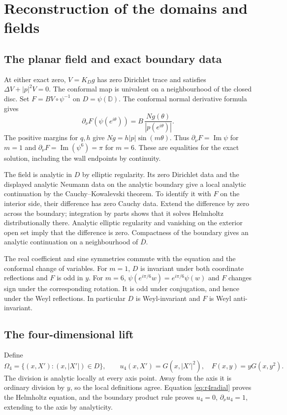 \documentclass[11pt]{amsart}
\theoremstyle{remark}
\numberwithin{equation}{section}
\newcommand{\D}{\mathbb D}
\newcommand{\im}{\operatorname{Im}}
\begin{document}
\section{Reconstruction of the domains and fields}\label{sec:reconstruction}
\subsection{The planar field and exact boundary data}
At either exact zero, $V=K_Dg$ has zero Dirichlet trace and satisfies
$\Delta V+|p|^2V=0$. The conformal map is univalent on a neighbourhood
of the closed disc. Set $F=B V\circ\psi^{-1}$ on $D=\psi(\D)$.
The conformal normal derivative formula gives
\[
 \partial_\nu F(\psi(e^{i\theta}))
       =B\,\frac{Ng(\theta)}{|p(e^{i\theta})|}.
\]
The positive margins for $q,h$ give $Ng=h|p|\sin(m\theta)$.
Thus $\partial_\nu F=\im\psi$ for $m=1$ and
$\partial_\nu F=\im(\psi^6)=\pi$ for $m=6$.
These are equalities for the exact solution, including the wall
endpoints by continuity.

The field is analytic in $D$ by elliptic regularity. Its zero
Dirichlet data and the displayed analytic Neumann data on the analytic
boundary give a local analytic continuation by the
Cauchy--Kowalevski theorem. To identify it with $F$ on the interior
side, their difference has zero Cauchy data. Extend the difference by
zero across the boundary; integration by parts shows that it solves
Helmholtz distributionally there. Analytic elliptic regularity and
vanishing on the exterior open set imply that the difference is zero.
Compactness of the boundary gives an analytic continuation on a
neighbourhood of $\overline D$.

The real coefficient and sine symmetries commute with the equation
and the conformal change of variables. For $m=1$, $D$ is invariant
under both coordinate reflections and $F$ is odd in $y$.
For $m=6$, $\psi(e^{i\pi/6}w)=e^{i\pi/6}\psi(w)$ and
$F$ changes sign under the corresponding rotation. It is odd under
conjugation, and hence under the Weyl reflections. In particular $D$
is Weyl-invariant and $F$ is Weyl anti-invariant.

\subsection{The four-dimensional lift}
Define
\[
 \Omega_4=\{(x,X'):(x,|X'|)\in D\},\qquad
 u_4(x,X')=G(x,|X'|^2),\quad F(x,y)=yG(x,y^2).
\]
The division is analytic locally at every axis point. Away from the
axis it is ordinary division by $y$, so the local definitions agree.
Equation \eqref{eq:r4radial} proves the Helmholtz equation, and the
boundary product rule proves $u_4=0$, $\partial_\nu u_4=1$, extending
to the axis by analyticity.
\end{document}
